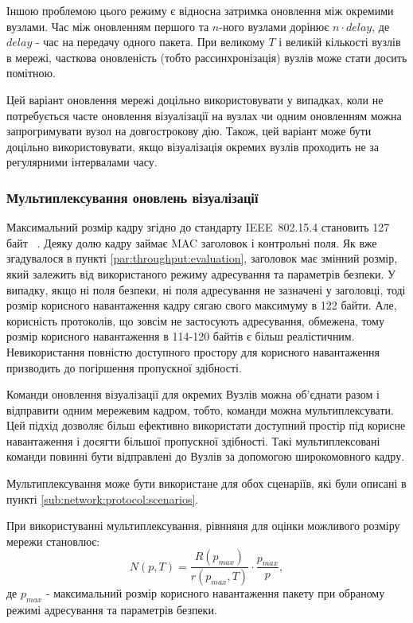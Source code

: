 \documentclass[a4paper,ukrainian,utf8,nocolumnsxix,floatsection,equationsection]{eskdtext}
\renewcommand\paragraph{\subsubsection}
\newcommand{\iee}[0]{IEEE~802.15.4\xspace}
\begin{document}
Іншою проблемою цього режиму є відносна затримка оновлення між окремими вузлами. Час між оновленням першого та $n$-ного вузлами дорінює $n \cdot delay$, де $delay$ - час на передачу одного пакета. При великому $T$ і великій кількості вузлів в мережі, часткова оновленість (тобто рассинхронізація) вузлів може стати досить помітною.

Цей варіант оновлення мережі доцільно використовувати у випадках, коли не потребується часте оновлення візуалізації на вузлах чи одним оновленням можна запрогримувати вузол на довгострокову дію. Також, цей варіант може бути доцільно використовувати, якщо візуалізація окремих вузлів проходить не за регулярними інтервалами часу.

\paragraph{Мультиплексування оновлень візуалізації}

Максимальний розмір кадру згідно до стандарту \iee становить 127 байт ~\cite{ieee:802:15:4:2011}. Деяку долю кадру займає MAC заголовок і контрольні поля. Як вже згадувалося в пункті \ref{par:throughput:evaluation}, заголовок має змінний розмір, який залежить від використаного режиму адресування та параметрів безпеки. У випадку, якщо ні поля безпеки, ні поля адресування не зазначені у заголовці, тоді розмір корисного навантаження кадру сягаю свого максимуму в 122 байти. Але, корисність протоколів, що зовсім не застосують адресування, обмежена, тому розмір корисного навантаження в 114-120 байтів є більш реалістичним. Невикористання повністю доступного простору для корисного навантаження призводить до погіршення пропускної здібності.

Команди оновлення візуалізації для окремих Вузлів можна об’єднати разом і відправити одним мережевим кадром, тобто, команди можна мультиплексувати. Цей підхід дозволяє більш ефективно використати доступний простір під корисне навантаження і досягти більшої пропускної здібності. Такі мультиплексовані команди повинні бути відправлені до Вузлів за допомогою широкомовного кадру.

Мультиплексування може бути використане для обох сценаріїв, які були описані в пункті \ref{sub:network:protocol:scenarios}.

При використуванні мультиплексування, рівнняня для оцінки можливого розміру мережи становлює:
\begin{equation}\label{eq:net:size:multiplex:send}
	N(p, T) = \frac{R(p_{max})}{r(p_{max}, T)} \cdot \frac{p_{max}}{p},
\end{equation}
де $p_{max}$ - максимальний розмір корисного навантаження пакету при обраному режимі адресування та параметрів безпеки.
\end{document}
